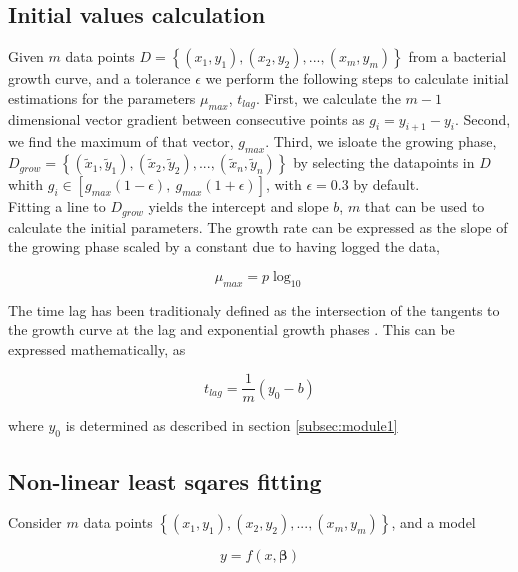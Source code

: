 \documentclass[titlepage,11pt]{article}
\begin{document}
\begin{linenumbers}
		\subsection{Initial values calculation}\label{subsec:initial_values}
		Given $ m $ data points $ D =  \left\{(x_1, y_1), (x_2, y_2), ... , (x_m, y_m)\right\} $ from a bacterial growth curve, and a tolerance $ \epsilon $ we perform the following steps to calculate initial estimations for the parameters $ \mu_{max} $, $ t_{lag} $. First, we calculate the $ m - 1 $ dimensional vector gradient between consecutive points as $ g_i = y_{i+1} - y_i $. Second, we find the maximum of that vector, $ g_{max} $. Third, we isloate the growing phase, $ D_{grow} = \left\{(\tilde{x}_1, \tilde{y}_1), (\tilde{x}_2, \tilde{y}_2), ... , (\tilde{x}_n, \tilde{y}_n)\right\} $ by selecting the datapoints in $ D $ whith $g_i \in [g_{max}(1-\epsilon), \ g_{max}(1+\epsilon)]$, with $ \epsilon = 0.3 $ by default.\\
		Fitting a line to $ D_{grow} $ yields the intercept and slope $ b $, $ m $ that can be used to calculate the initial parameters. The growth rate can be expressed as the slope of the growing phase scaled by a constant due to having logged the data, 
		\begin{linenomath*}
			\begin{equation}
			\mu_{max}  = p\log_{10}
			\end{equation}
		\end{linenomath*}
		
		The time lag has been traditionaly defined as the intersection of the tangents to the growth curve at the lag and exponential growth phases \cite{Micha2011}. This can be expressed mathematically, as 
		\begin{linenomath*}
			\begin{equation}
			t_{lag} = \frac{1}{m}(y_0 - b)
			\end{equation}
		\end{linenomath*}
		
		where $ y_0  $ is determined as described in section \ref{subsec:module1}
		\subsection{Non-linear least sqares fitting}\label{subsec:non-linear least squares fitting}
		Consider $ m $ data points $ \left\{(x_1, y_1), (x_2, y_2), ... , (x_m, y_m)\right\} $, and a model
		\begin{linenomath*}
			\begin{equation}
			y = f(x, \boldsymbol{\beta})
			\end{equation}
		\end{linenomath*}
		

\end{linenumbers}
\end{document}
